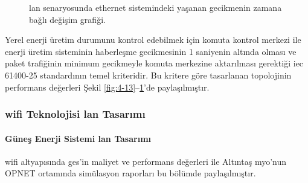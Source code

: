 \begin{figure}[htbp]

\centering

\caption{\gls{lan} senaryosunda ethernet sistemindeki yaşanan gecikmenin zamana bağlı değişim grafiği.}
\label{fig:4-15}
\end{figure}

Yerel enerji üretim durumunu kontrol edebilmek için komuta kontrol merkezi ile enerji üretim sisteminin haberleşme gecikmesinin 1 saniyenin altında olması ve paket trafiğinin minimum gecikmeyle komuta merkezine aktarılması gerektiği \gls{iec} 61400-25 standardının temel kriteridir. Bu kritere göre tasarlanan topolojinin performans değerleri Şekil \ref{fig:4-13}--\ref{fig:4-15}’de paylaşılmıştır.
\newpage  %
\subsubsection{\gls{wifi} Teknolojisi \gls{lan} Tasarımı}\label{yerelWifi}

\paragraph{Güneş Enerji Sistemi \gls{lan} Tasarımı}

\gls{wifi} altyapısında \gls{ges}'in maliyet ve performans değerleri ile Altıntaş \gls{myo}’nun OPNET ortamında simülasyon raporları bu bölümde paylaşılmıştır.


